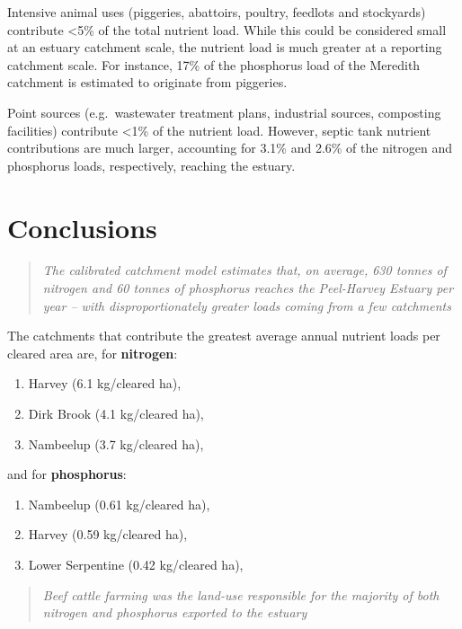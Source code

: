 \documentclass[
]{book}
\providecommand{\tightlist}{%
  \setlength{\itemsep}{0pt}\setlength{\parskip}{0pt}}
\begin{document}
Intensive animal uses (piggeries, abattoirs, poultry, feedlots and stockyards) contribute \textless5\% of the total nutrient load. While this could be considered small at an estuary catchment scale, the nutrient load is much greater at a reporting catchment scale. For instance, 17\% of the phosphorus load of the Meredith catchment is estimated to originate from piggeries.

Point sources (e.g.~wastewater treatment plans, industrial sources, composting facilities) contribute \textless1\% of the nutrient load. However, septic tank nutrient contributions are much larger, accounting for 3.1\% and 2.6\% of the nitrogen and phosphorus loads, respectively, reaching the estuary.

\hypertarget{conclusions-6}{%
\section{Conclusions}\label{conclusions-6}}

\begin{quote}
\emph{The calibrated catchment model estimates that, on average, 630 tonnes of nitrogen and 60 tonnes of phosphorus reaches the Peel-Harvey Estuary per year -- with disproportionately greater loads coming from a few catchments}
\end{quote}

The catchments that contribute the greatest average annual nutrient loads per cleared area are, for \textbf{nitrogen}:

\begin{enumerate}
\def\labelenumi{\arabic{enumi}.}
\item
  Harvey (6.1 kg/cleared ha),
\item
  Dirk Brook (4.1 kg/cleared ha),
\item
  Nambeelup (3.7 kg/cleared ha),
\end{enumerate}

and for \textbf{phosphorus}:~

\begin{enumerate}
\def\labelenumi{\arabic{enumi}.}
\tightlist
\item
  Nambeelup (0.61 kg/cleared ha),
\item
  Harvey (0.59 kg/cleared ha),
\item
  Lower Serpentine (0.42 kg/cleared ha),
\end{enumerate}

\begin{quote}
\emph{Beef cattle farming was the land-use responsible for the majority of both nitrogen and phosphorus exported to the estuary}
\end{quote}
\end{document}
